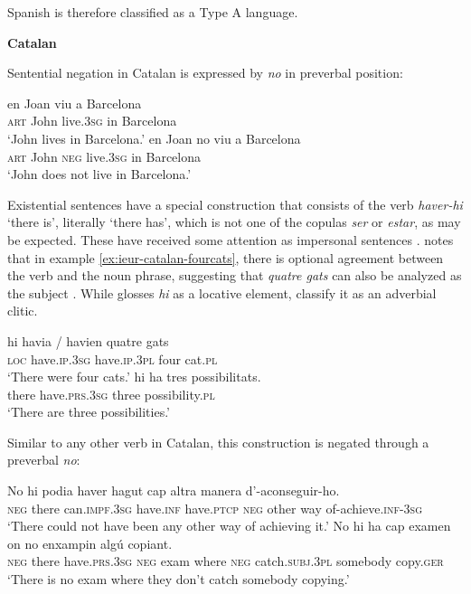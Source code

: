 ﻿\documentclass[output=paper]{langsci/langscibook}
\begin{document}
\begin{unindented}
Spanish is therefore classified as a Type A language. 

\textbf{Catalan}

Sentential negation in Catalan is expressed by \textit{no} in preverbal position: 
%
\begin{exe}\ex \gll en Joan viu a Barcelona \\
\textsc{art} John  live.\textsc{3sg} in Barcelona \\
    \glt `John lives in Barcelona.' \citep[154]{Hualde1992}
\ex \gll en Joan  no viu a Barcelona \\
\textsc{art} John  \textsc{neg} live.\textsc{3sg} in Barcelona \\
    \glt `John does not live in Barcelona.' \citep[154]{Hualde1992}
    \end{exe}

Existential sentences have a special construction that consists of the verb
\textit{haver-hi} `there is', literally `there has', which is not one of
the copulas \textit{ser} or \textit{estar}, as may be expected. These have
received some attention as impersonal sentences \parencites[81]{Hualde1992}
[460]{WheelerYates1999}. \citet[81]{Hualde1992} notes that in example
\ref{ex:ieur-catalan-fourcats},
there is optional agreement between the verb and the noun phrase,
suggesting that \textit{quatre gats} can also be analyzed as the subject
\parencite[see also][460]{WheelerYates1999}. While \citet{Hualde1992} glosses \textit{hi} as a locative element, \citet[460]{WheelerYates1999} classify it as an adverbial clitic. 
%
\begin{exe}\ex\label{ex:ieur-catalan-fourcats} \gll hi havia / havien quatre gats \\
\textsc{loc} have.\textsc{ip.3sg} {} have.\textsc{ip.3pl} four cat.\textsc{pl} \\
    \glt `There were four cats.' \citep[81]{Hualde1992}
\ex \gll hi ha tres possibilitats.  \\
there have.\textsc{prs.3sg} three  possibility.\textsc{pl} \\
    \glt `There are three possibilities.' \parencite[460]{WheelerYates1999}
    \end{exe}

Similar to any other verb in Catalan, this construction is negated through a preverbal \textit{no}: 
%
\begin{exe}\ex \gll No hi podia haver hagut cap  altra manera d’-aconseguir-ho. \\
\textsc{neg} there can.\textsc{impf.3sg} have.\textsc{inf} have.\textsc{ptcp} \textsc{neg} other way of-achieve.\textsc{inf-3sg} \\
    \glt `There could not have been any other way of achieving it.'
\parencite[460]{WheelerYates1999}
\ex \gll No hi ha cap examen on no enxampin algú copiant.  \\
\textsc{neg} there have.\textsc{prs.3sg} \textsc{neg} exam     where \textsc{neg} catch.\textsc{subj.3pl} somebody copy.\textsc{ger} \\
    \glt `There is no exam where they don't catch somebody copying.' \parencite[422]{WheelerYates1999}
    \end{exe}


\end{unindented}
\end{document}
